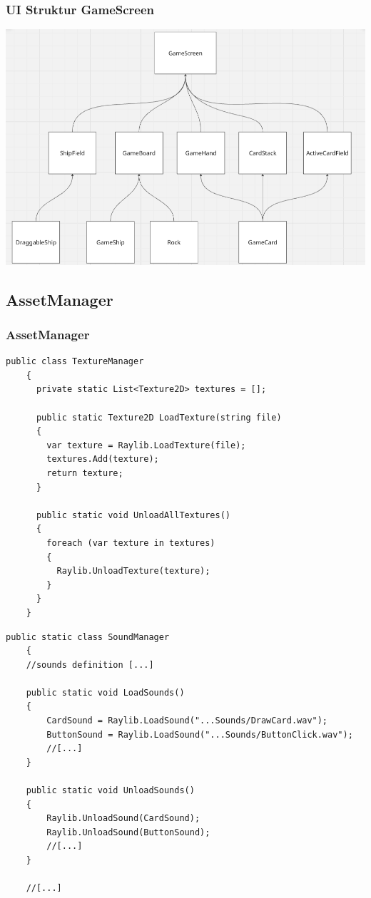 \documentclass{beamer}
\begin{document}
\begin{frame}
  \frametitle{UI Struktur GameScreen}
  \includegraphics[width=\textwidth]{UI-Struktur.png}
\end{frame}

\subsection{AssetManager}
\begin{frame}[fragile]
\frametitle{AssetManager}
\begin{multicols}{2}
  
  \begin{lstlisting}[language=CSharp, basicstyle=\ttfamily\tiny, breaklines=true]
    public class TextureManager
    {
      private static List<Texture2D> textures = [];
      
      public static Texture2D LoadTexture(string file)
      {
        var texture = Raylib.LoadTexture(file);
        textures.Add(texture);
        return texture;
      }
        
      public static void UnloadAllTextures()
      {
        foreach (var texture in textures)
        {
          Raylib.UnloadTexture(texture);
        }
      }
    }
  \end{lstlisting}
  \columnbreak
  \begin{lstlisting}[language=CSharp, basicstyle=\ttfamily\tiny, breaklines=true]
    public static class SoundManager
    {
    //sounds definition [...]

    public static void LoadSounds()
    {
        CardSound = Raylib.LoadSound("...Sounds/DrawCard.wav");
        ButtonSound = Raylib.LoadSound("...Sounds/ButtonClick.wav");
        //[...]
    }

    public static void UnloadSounds()
    {
        Raylib.UnloadSound(CardSound);
        Raylib.UnloadSound(ButtonSound);
        //[...]
    }
    
    //[...]
  \end{lstlisting}
\end{multicols}
\end{frame}
\end{document}
